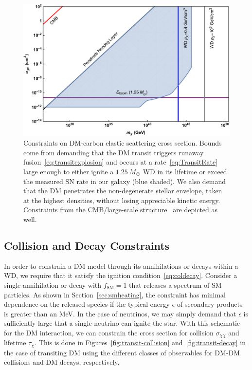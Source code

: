 \begin{figure}
\includegraphics[scale=.45]{transitobservation.pdf}
\caption{Constraints on DM-carbon elastic scattering cross section.
Bounds come from demanding that the DM transit triggers runaway fusion~\eqref{eq:transitexplosion} and occurs at a rate~\eqref{eq:TransitRate} large enough to either ignite a $1.25~M_{\astrosun}$ WD in its lifetime or exceed the measured SN rate in our galaxy (blue shaded).
We also demand that the DM penetrates the non-degenerate stellar envelope, taken at the highest densities, without losing appreciable kinetic energy.
Constraints from the CMB/large-scale structure~\cite{Dvorkin:2013cea} are depicted as well.
}
\label{fig:transit-elastic}
\end{figure}

\subsection{Collision and Decay Constraints}
\label{sec:CollisionConstraints}

In order to constrain a DM model through its annihilations or decays within a WD, we require that it satisfy the ignition condition~\eqref{eq:coldecay}.
Consider a single annihilation or decay with $f_\text{SM} = 1$ that releases a spectrum of SM particles.
As shown in Section~\ref{sec:smheating}, the constraint has minimal dependence on the released species if the typical energy $\epsilon$ of secondary products is greater than an MeV.
In the case of neutrinos, we may simply demand that $\epsilon$ is sufficiently large that a single neutrino can ignite the star.
With this schematic for the DM interaction, we can constrain the cross section for collision $\sigma_{\chi \chi}$ and lifetime $\tau_\chi$.
This is done in Figures~\ref{fig:transit-collision} and~\ref{fig:transit-decay} in the case of transiting DM using the different classes of observables for DM-DM collisions and DM decays, respectively.

